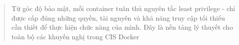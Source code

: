 \begin{quote}
Từ góc độ bảo mật, mỗi container tuân thủ nguyên tắc least privilege - chỉ được cấp đúng những quyền, tài nguyên và khả năng truy cập tối thiểu cần thiết để thực hiện chức năng của mình. Đây là nền tảng lý thuyết cho toàn bộ các khuyến nghị trong CIS Docker
\end{quote}

\protect{}\label{CIS_Docker_Benchmark}{}
